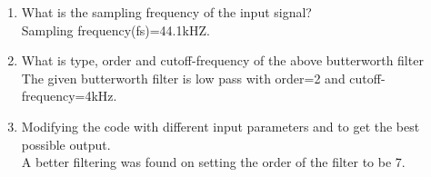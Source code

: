 \documentclass[journal,12pt,twocolumn]{IEEEtran}
\renewcommand\thesection{\arabic{section}}
\begin{document}
\begin{enumerate}[label=\thesection.\arabic*]
\begin{figure}[!ht]
\label{fig:19}	
\end{figure}
\item What is the sampling frequency of the input signal?
\\
\solution
Sampling frequency(fs)=44.1kHZ.
\item
What is type, order and  cutoff-frequency of the above butterworth filter
\\
\solution
The given butterworth filter is low pass with order=2 and cutoff-frequency=4kHz.
%
\item
Modifying the code with different input parameters and to get the best possible output.\\
\solution
A better filtering was found on setting the order of the filter to be 7.
\end{enumerate}
\end{document}
